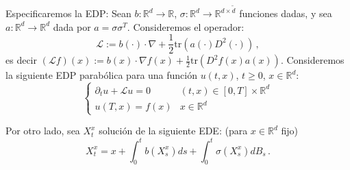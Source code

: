 Especificaremos la EDP: Sean $b: \mathbb{R}^{d} \to \mathbb{R}$, $\sigma : \mathbb{R}^{d} \to  \mathbb{R}^{d \times \tilde{d}}$ funciones dadas, y sea $a: \mathbb{R}^{d} \to \mathbb{R}^{d}$ dada por $a = \sigma \sigma^T$. Consideremos el operador:
\begin{equation*}
    \mathcal{L} := b(\cdot) \cdot \nabla + \frac{1}{2} \text{tr}(a(\cdot) D^2 (\cdot )) \,,
\end{equation*}
es decir $(\mathcal{L} f)(x) := b(x) \cdot \nabla f(x) + \frac{1}{2} \text{tr}(D^2 f(x) a(x))$. 
\newp Consideremos la siguiente EDP parabólica para una función $u(t,x)$, $t \ge 0$, $x \in \mathbb{R}^{d}$: 
\begin{equation*}
    \label{eq:sde_11} 
    \tag{*} 
    \begin{cases}
        \partial_t u + \mathcal{L} u = 0 & (t,x) \in [0,T] \times \mathbb{R}^{d} \\ 
            u(T,x) = f(x) & x \in \mathbb{R}^{d}
    \end{cases}
\end{equation*}

Por otro lado, sea $X_t^{x}$ solución de la siguiente EDE: (para $x \in \mathbb{R}^d$ fijo)
\begin{equation*}
    \label{eq:sde_12}
    \tag{**}
    X_t^x = x + \int_{0}^{t} b(X_s^x) ds + \int_{0}^{t} \sigma (X_s^x) dB_s \,.
\end{equation*}

